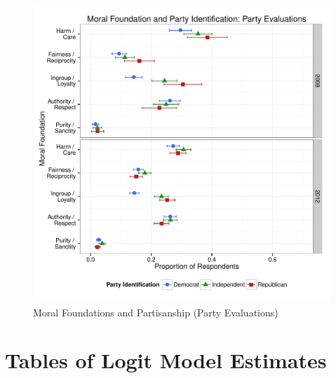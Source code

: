 \documentclass[12pt]{article}
\begin{document}
\begin{figure}[ht]\centering
\includegraphics[scale=.4]{../calc/fig/a3_mft_pid_pa.pdf}
\caption{Moral Foundations and Partisanship (Party Evaluations)}\label{fig:a3_mft_pid_pa}
\end{figure}


\clearpage
\section{Tables of Logit Model Estimates}
\renewcommand\thefigure{\thesection.\arabic{figure}}
\renewcommand\thetable{\thesection.\arabic{table}}
\setcounter{figure}{0}
\setcounter{table}{0}









\clearpage


\end{document}
